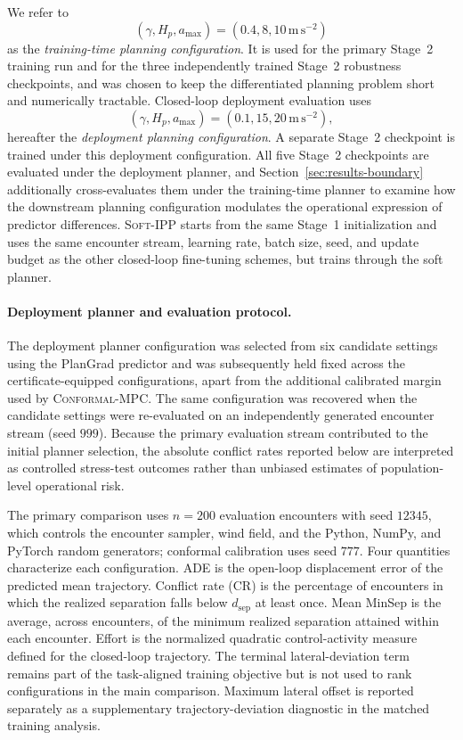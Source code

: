 \documentclass[11pt]{article}
\theoremstyle{plain}
\theoremstyle{definition}
\newcommand{\method}{PlanGrad}
\begin{document}
We refer to
\[
(\gamma,H_p,a_{\max})=(0.4,8,10\,\mathrm{m\,s^{-2}})
\]
as the \emph{training-time planning configuration}. It is used for
the primary Stage~2 training run and for the three independently
trained Stage~2 robustness checkpoints, and was chosen to keep the
differentiated planning problem short and numerically tractable.
Closed-loop deployment evaluation uses
\[
(\gamma,H_p,a_{\max})=(0.1,15,20\,\mathrm{m\,s^{-2}}),
\]
hereafter the \emph{deployment planning configuration}. A separate
Stage~2 checkpoint is trained under this deployment configuration.
All five Stage~2 checkpoints are evaluated under the deployment
planner, and Section~\ref{sec:results-boundary} additionally
cross-evaluates them under the training-time planner to examine how
the downstream planning configuration modulates the operational
expression of predictor differences. \textsc{Soft-IPP} starts
from the same Stage~1 initialization and uses the same encounter
stream, learning rate, batch size, seed, and update budget as the
other closed-loop fine-tuning schemes, but trains through the soft
planner.

\paragraph{Deployment planner and evaluation protocol.}
The deployment planner configuration was selected from six candidate
settings using the \method{} predictor and was subsequently held
fixed across the certificate-equipped configurations, apart from the
additional calibrated margin used by \textsc{Conformal-MPC}. The
same configuration was recovered when the candidate settings were
re-evaluated on an independently generated encounter stream
(seed $999$). Because the primary evaluation stream contributed to
the initial planner selection, the absolute conflict rates reported
below are interpreted as controlled stress-test outcomes rather than
unbiased estimates of population-level operational risk.

The primary comparison uses $n=200$ evaluation encounters with seed
$12345$, which controls the encounter sampler, wind field, and the
Python, NumPy, and PyTorch random generators; conformal calibration
uses seed $777$. Four quantities characterize each configuration.
ADE is the open-loop displacement error of the predicted mean
trajectory. Conflict rate (CR) is the percentage of encounters in
which the realized separation falls below $d_{\mathrm{sep}}$ at
least once. Mean MinSep is the average, across encounters, of the
minimum realized separation attained within each encounter. Effort is
the normalized quadratic control-activity measure defined for the
closed-loop trajectory. The terminal lateral-deviation term remains part of the task-aligned
training objective but is not used to rank configurations in the main
comparison. Maximum lateral offset is reported separately as a
supplementary trajectory-deviation diagnostic in the matched training
analysis.
\end{document}
